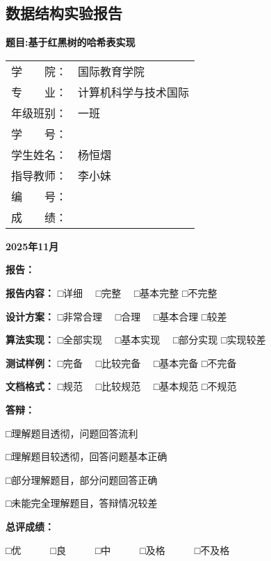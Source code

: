 \documentclass[12pt,a4paper]{article}
\begin{document}
\begin{center}

\section*{\textbf{\fontsize{26pt}{30pt}\selectfont 数据结构实验报告}}
\label{sec:data_structure_lab_report}
\vspace{0.5cm}
\textbf{\fontsize{22pt}{26pt}\selectfont 题目:基于红黑树的哈希表实现}

\vspace{2cm}
\begin{tabular}{ll}
\fontsize{16pt}{19pt}\selectfont 学　　院： & \fontsize{16pt}{19pt}\selectfont 国际教育学院\\
\fontsize{16pt}{19pt}\selectfont 专　　业： & \fontsize{16pt}{19pt}\selectfont 计算机科学与技术国际\\
\fontsize{16pt}{19pt}\selectfont 年级班别： & \fontsize{16pt}{19pt}\selectfont 一班\\
\fontsize{16pt}{19pt}\selectfont 学　　号： & \fontsize{16pt}{19pt}\selectfont 3124009862\\
\fontsize{16pt}{19pt}\selectfont 学生姓名： & \fontsize{16pt}{19pt}\selectfont 杨恒熠\\
\fontsize{16pt}{19pt}\selectfont 指导教师： & \fontsize{16pt}{19pt}\selectfont 李小妹\\
\fontsize{16pt}{19pt}\selectfont 编　　号： & \fontsize{16pt}{19pt}\selectfont \dotfill\\
\fontsize{16pt}{19pt}\selectfont 成　　绩： & \fontsize{16pt}{19pt}\selectfont \dotfill\\
\end{tabular}
\vfill
\textbf{2025年11月}
\end{center}

\newpage
\begin{center}
\textbf{报告：}

\textbf{报告内容：} □详细　 □完整　 □基本完整 □不完整

\textbf{设计方案：} □非常合理　 □合理　 □基本合理 □较差

\textbf{算法实现：} □全部实现　 □基本实现　 □部分实现 □实现较差

\textbf{测试样例：} □完备　 □比较完备　 □基本完备 □不完备

\textbf{文档格式：} □规范　 □比较规范　 □基本规范 □不规范

\vspace{1cm}
\textbf{答辩：}

□理解题目透彻，问题回答流利

□理解题目较透彻，回答问题基本正确

□部分理解题目，部分问题回答正确

□未能完全理解题目，答辩情况较差

\vspace{1cm}
\textbf{总评成绩：}

□优　　　□良　　　□中　　　□及格　　　□不及格
\end{center}
\end{document}
